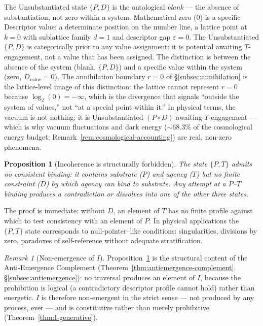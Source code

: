 \documentclass[11pt,a4paper]{article}
\newtheorem{proposition}[theorem]{Proposition}
\theoremstyle{definition}
\theoremstyle{remark}
\newtheorem{remark}[theorem]{Remark}
\begin{document}
The Unsubstantiated state $\{P,D\}$ is the ontological \emph{blank} --- the absence of substantiation, not zero within a system. Mathematical zero ($0$) is a specific Descriptor value: a determinate position on the number line, a lattice point at $k = 0$ with sublattice family $d = 1$ and descriptor gap $\varepsilon = 0$. The Unsubstantiated $\{P,D\}$ is categorically prior to any value assignment: it is potential awaiting $T$-engagement, not a value that has been assigned. The distinction is between the absence of the system (blank, $\{P,D\}$) and a specific value within the system (zero, $D_{\mathrm{value}} = 0$). The annihilation boundary $r = 0$ of \S\ref{subsec:annihilation} is the lattice-level image of this distinction: the lattice cannot represent $r = 0$ because $\log_{2}(0) = -\infty$, which is the divergence that signals ``outside the system of values,'' not ``at a special point within it.'' In physical terms, the vacuum is not nothing; it is Unsubstantiated $(P \circ D)$ awaiting $T$-engagement --- which is why vacuum fluctuations and dark energy ($\sim 68.3\%$ of the cosmological energy budget; Remark~\ref{rem:cosmological-accounting}) are real, non-zero phenomena.

\begin{proposition}[Incoherence is structurally forbidden]\label{prop:incoherence}
The state $\{P,T\}$ admits no consistent binding: it contains substrate ($P$) and agency ($T$) but no finite constraint ($D$) by which agency can bind to substrate. Any attempt at a $P$--$T$ binding produces a contradiction or dissolves into one of the other three states.
\end{proposition}

The proof is immediate: without $D$, an element of $T$ has no finite profile against which to test consistency with an element of $P$. In physical applications the $\{P,T\}$ state corresponds to null-pointer--like conditions: singularities, divisions by zero, paradoxes of self-reference without adequate stratification.

\begin{remark}[Non-emergence of $I$]\label{rem:I-nonemergent}
Proposition~\ref{prop:incoherence} is the structural content of the Anti-Emergence Complement (Theorem~\ref{thm:antiemergence-complement}, \S\ref{subsec:antiemergence}): no traversal produces an element of $I$, because the prohibition is logical (a contradictory descriptor profile cannot hold) rather than energetic. $I$ is therefore non-emergent in the strict sense --- not produced by any process, ever --- and is constitutive rather than merely prohibitive (Theorem~\ref{thm:I-generative}).
\end{remark}
\end{document}
